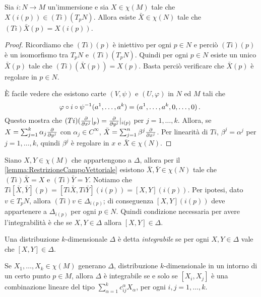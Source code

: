 \begin{lemma}\label{lemma:RestrizioneCampoVettoriale}
	Sia $i:N\to M$ un'immersione e sia $X\in\chi(M)$ tale che
	$X(i(p))\in (Ti)(T_pN)$. Allora esiste $\bar X\in\chi(N)$ tale che $(Ti)\bar X (p) = X(i(p))$.
\end{lemma}

\begin{proof}
	Ricordiamo che $(Ti)(p)$ è iniettivo per ogni $p\in N$ e perciò $(Ti)(p)$ è un isomorfismo tra $T_pN$ e $(Ti)(T_pN)$. Quindi per ogni $p\in N$ esiste un unico $\bar X(p)$ tale che $(Ti)(\bar X(p)) = X(p)$. Basta perciò verificare che $\bar X(p)$ è regolare in $p\in N$.
	
	È facile vedere che esistono carte $(V,\psi)$ e $(U,\varphi)$ in $N$ ed $M$ tali che
	\begin{equation*}
	\varphi\circ i \circ\psi^{-1}(a^1,\ldots, a^k) = (a^1,\ldots,a^k,0,\ldots,0)\, \text{. }
	\end{equation*}
	Questo mostra che $(Ti)(\frac{\partial }{\partial x^j}|_{p}) = \frac{\partial }{\partial y^j}|_{i(p)}$ per $j=1,\ldots,k$.
	Allora, se $X=\sum_{j=1}^k\alpha_j\frac{\partial }{\partial y^j}$ con $\alpha_j\in C^\infty$, $\bar X = \sum_{j=1}^n\beta^j\frac{\partial }{\partial x^j}$. Per linearità di $Ti$, $\beta^j=\alpha^j$ per $j=1,\ldots,k$, quindi $\beta^j$ è regolare in $x$ e $\bar X\in\chi(N)$.
\end{proof}

Siano $X,Y\in\chi(M)$ che appartengono a $\Delta$, allora per il \cref{lemma:RestrizioneCampoVettoriale} esistono $\bar X,\bar Y\in\chi(N)$ tale che $(Ti)\bar X=X$ e $(Ti)\bar Y=Y$.
Notiamo che $Ti[\bar X,\bar Y](p) = [Ti\bar X,Ti\bar Y](i(p)) = [X,Y] (i(p))$. Per ipotesi, dato $v\in T_pN$, allora $(Ti)v\in\Delta_{i(p)}$; di conseguenza $[X,Y](i(p))$ deve appartenere a $\Delta_{i(p)}$ per ogni $p\in N$.
Quindi condizione necessaria per avere l'integrabilità è che se $X,Y\in\Delta$ allora $[X,Y]\in\Delta$.

\begin{definition} 
	Una distribuzione $k$-dimensionale $\Delta$ è detta \emph{integrabile} se per ogni $X,Y\in\Delta$ vale che $[X,Y]\in\Delta$.
\end{definition}

\begin{proposition} \label{prop:IntegrabilitaDaCampi} %
	Se $X_1,\ldots,X_k\in\chi(M)$ generano $\Delta$, distribuzione $k$-dimensionale in un intorno di un certo punto $p\in M$, allora $\Delta$ è integrabile se e solo se $[X_i,X_j]$ è una combinazione lineare del tipo $\sum_{\alpha=1}^kc_{ij}^\alpha X_\alpha$, per ogni $i,j=1,\ldots,k$.
\end{proposition}

